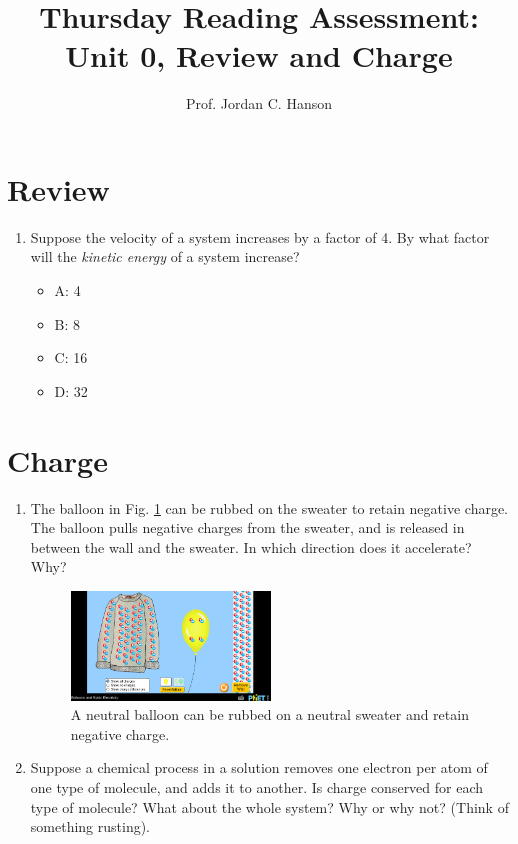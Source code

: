 \documentclass{article}
\begin{document}
\title{Thursday Reading Assessment: Unit 0, Review and Charge}
\author{Prof. Jordan C. Hanson}

\maketitle

\section{Review}

\begin{enumerate}
\item Suppose the velocity of a system increases by a factor of 4.  By what factor will the \textit{kinetic energy} of a system increase?
\begin{itemize}
\item A: 4
\item B: 8
\item C: 16
\item D: 32
\end{itemize}
\end{enumerate}

\section{Charge}

\begin{enumerate}
\item The balloon in Fig. \ref{fig:balloon} can be rubbed on the sweater to retain negative charge.  The balloon pulls negative charges from the sweater, and is released in between the wall and the sweater.  In which direction does it accelerate?  Why? \\ \vspace{2cm}
\begin{figure}
\centering
\includegraphics[width=0.5\textwidth]{balloon.png}
\caption{\label{fig:balloon} A neutral balloon can be rubbed on a neutral sweater and retain negative charge.}
\end{figure}
\item Suppose a chemical process in a solution removes one electron per atom of one type of molecule, and adds it to another.  Is charge conserved for each type of molecule?  What about the whole system?  Why or why not?  (Think of something rusting).
\end{enumerate}
\end{document}
